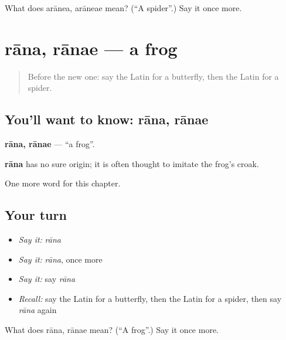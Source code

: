 \begin{tcolorbox}[breakable,colback=teal!4,colframe=teal!35!black,title={Before you move on}]
What does arānea, arāneae mean? (\textquotedblleft{}A spider\textquotedblright{}.) Say it once more.
\end{tcolorbox}
\section[rāna, rānae]{rāna, rānae — a frog}

\label{lesson:LA-C133-rana}



\begin{quote}
Before the new one: say the Latin for a butterfly, then the Latin for a spider.
\end{quote}

\subsection*{You'll want to know: rāna, rānae}
\textbf{rāna, rānae} — \textquotedblleft{}a frog\textquotedblright{}.

\begin{cousinweb}
\textbf{rāna} has no sure origin; it is often thought to imitate the frog's croak.
\end{cousinweb}

\begin{grammarlens}[title={What you've built}]
One more word for this chapter.
\end{grammarlens}

\subsection*{Your turn}
\begin{itemize}
\raggedright
  \item \emph{Say it:} \emph{rāna}
  \item \emph{Say it:} \emph{rāna}, once more
  \item \emph{Say it:} say \emph{rāna}
  \item \emph{Recall:} say the Latin for a butterfly, then the Latin for a spider, then say \emph{rāna} again
\end{itemize}

\begin{tcolorbox}[breakable,colback=teal!4,colframe=teal!35!black,title={Before you move on}]
What does rāna, rānae mean? (\textquotedblleft{}A frog\textquotedblright{}.) Say it once more.
\end{tcolorbox}

